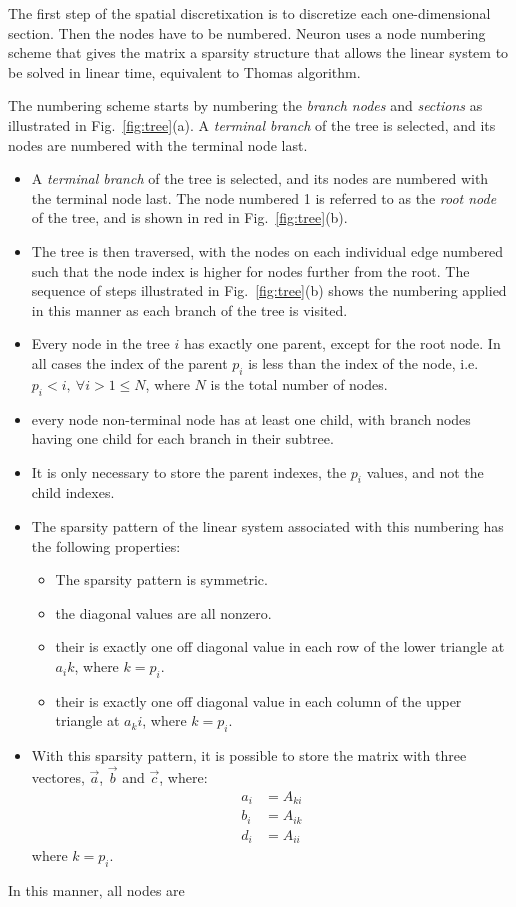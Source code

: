 \documentclass[11pt,a4paper]{article}
\newcommand{\fig}[1]{Fig.~\ref{#1}} %
\begin{document}
The first step of the spatial discretixation is to discretize each one-dimensional section. Then the nodes have to be numbered. Neuron uses a node numbering scheme that gives the matrix a sparsity structure that allows the linear system to be solved in linear time, equivalent to Thomas algorithm.

The numbering scheme starts by numbering the \emph{branch nodes} and \emph{sections} as illustrated in \fig{fig:tree}(a).
A \emph{terminal branch} of the tree is selected, and its nodes are numbered with the terminal node last.


\begin{itemize}
\item
    A \emph{terminal branch} of the tree is selected, and its nodes are numbered with the terminal node last.
    The node numbered 1 is referred to as the \emph{root node} of the tree, and is shown in red in \fig{fig:tree}(b).
\item
    The tree is then traversed, with the nodes on each individual edge numbered such that the node index is higher for nodes further from the root. The sequence of steps illustrated in \fig{fig:tree}(b) shows the numbering applied in this manner as each branch of the tree is visited.
\item
    Every node in the tree $i$ has exactly one parent, except for the root node. In all cases the index of the parent $p_i$ is less than the index of the node, i.e. $p_i<i,~\forall i>1\leq N$, where $N$ is the total number of nodes.
\item
    every node non-terminal node has at least one child, with branch nodes having one child for each branch in their subtree.
\item
    It is only necessary to store the parent indexes, the $p_i$ values, and not the child indexes.
\item
    The sparsity pattern of the linear system associated with this numbering has the following properties:
    \begin{itemize}
    \item
        The sparsity pattern is symmetric.
    \item
        the diagonal values are all nonzero.
    \item
        their is exactly one off diagonal value in each row of the lower triangle at $a_ik$, where $k=p_i$.
    \item
        their is exactly one off diagonal value in each column of the upper triangle at $a_ki$, where $k=p_i$.
    \end{itemize}
\item
    With this sparsity pattern, it is possible to store the matrix with three vectores, $\vec{a}$, $\vec{b}$ and $\vec{c}$, where:
    \begin{align}
        a_i &= A_{ki} \\
        b_i &= A_{ik} \\
        d_i &= A_{ii}
    \end{align}
    where $k=p_i$.
\end{itemize}
In this manner, all nodes are 
\end{document}
